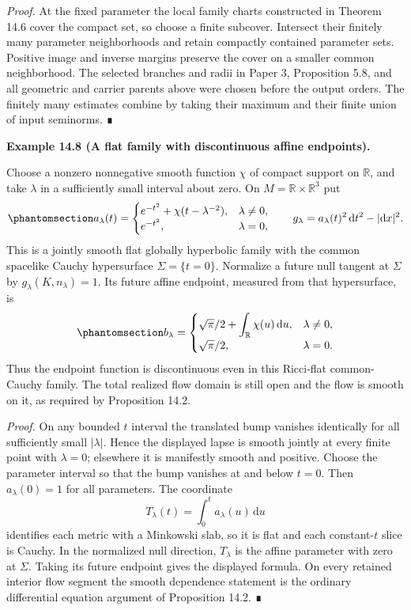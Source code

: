 \documentclass[
  english,
  11pt,
  reqno]{amsart}
\makeatletter
\newcommand{\pandocstatementheading}[1]{%
  \par\addpenalty{\@beginparpenalty}%
  \addvspace{.5\baselineskip plus .2\baselineskip minus .2\baselineskip}%
  {\normalfont\bfseries #1\par}%
  \nobreak\@afterindenttrue\@afterheading
}
\makeatother
\begin{document}
\emph{Proof.} At the fixed parameter the local family charts constructed
in Theorem 14.6 cover the compact set, so choose a finite subcover.
Intersect their finitely many parameter neighborhoods and retain
compactly contained parameter sets. Positive image and inverse margins
preserve the cover on a smaller common neighborhood. The selected
branches and radii in Paper 3, Proposition 5.8, and all geometric and
carrier parents above were chosen before the output orders. The finitely
many estimates combine by taking their maximum and their finite union of
input seminorms. ∎

\pandocstatementheading{\protect{}\label{ex:family-affine-endpoint-jump}Example 14.8 (A flat family with discontinuous affine endpoints).}

Choose a nonzero nonnegative smooth function \(\chi\) of compact support
on \(\mathbb R\), and take \(\lambda\) in a sufficiently small interval
about zero. On \(M=\mathbb R\times\mathbb R^3\) put
\begin{equation}\protect\phantomsection\label{eq:family-escaping-lapse-bump}{
a_\lambda(t)=
\begin{cases}
 e^{-t^2}+\chi(t-\lambda^{-2}),&\lambda\ne0,\\
 e^{-t^2},&\lambda=0,
\end{cases}
\qquad
g_\lambda=a_\lambda(t)^2\,\mathrm dt^2-|\mathrm dx|^2.
}\end{equation} This is a jointly smooth flat globally hyperbolic family
with the common spacelike Cauchy hypersurface \(\Sigma=\{t=0\}\).
Normalize a future null tangent at \(\Sigma\) by
\(g_\lambda(K,n_\lambda)=1\). Its future affine endpoint, measured from
that hypersurface, is
\begin{equation}\protect\phantomsection\label{eq:family-discontinuous-affine-endpoint}{
b_\lambda=
\begin{cases}
 \sqrt\pi/2+\displaystyle\int_{\mathbb R}\chi(u)\,\mathrm du,
   &\lambda\ne0,\\
 \sqrt\pi/2,&\lambda=0.
\end{cases}
}\end{equation} Thus the endpoint function is discontinuous even in this
Ricci-flat common-Cauchy family. The total realized flow domain is still
open and the flow is smooth on it, as required by Proposition 14.2.

\emph{Proof.} On any bounded \(t\) interval the translated bump vanishes
identically for all sufficiently small \(|\lambda|\). Hence the
displayed lapse is smooth jointly at every finite point with
\(\lambda=0\); elsewhere it is manifestly smooth and positive. Choose
the parameter interval so that the bump vanishes at and below \(t=0\).
Then \(a_\lambda(0)=1\) for all parameters. The coordinate \[
T_\lambda(t)=\int_0^t a_\lambda(u)\,\mathrm du
\] identifies each metric with a Minkowski slab, so it is flat and each
constant-\(t\) slice is Cauchy. In the normalized null direction,
\(T_\lambda\) is the affine parameter with zero at \(\Sigma\). Taking
its future endpoint gives the displayed formula. On every retained
interior flow segment the smooth dependence statement is the ordinary
differential equation argument of Proposition 14.2. ∎
\end{document}
